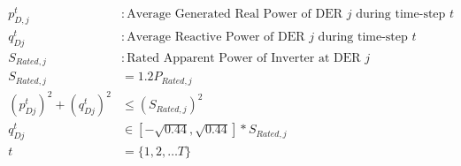 \begin{gather}
	\begin{align}
		{p^t_{D,j}} &: {\text{Average Generated Real Power of DER $j$ during time-step $t$}} \nonumber\\
		{q^t_{Dj}} &: {\text{Average Reactive Power of DER $j$ during time-step $t$ }} \nonumber\\
		{S_{Rated, j}} &: {\text{Rated Apparent Power of Inverter at DER $j$}} \nonumber\\
		{S_{Rated,j}} &= {1.2P_{Rated,j}} \\
		{ (p^t_{Dj})^2 + (q^t_{Dj})^2} &\leq {(S_{Rated,j})^2} \\
		{q^t_{Dj}} &\in {[-\sqrt{0.44}, \sqrt{0.44}]*S_{Rated,j}} \\
		{t} &= {\{1, 2, \ldots T\}}\nonumber
	\end{align}
\end{gather}

